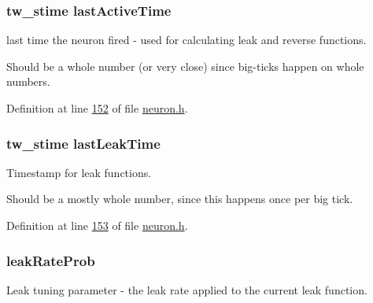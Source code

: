 \hypertarget{structneuron_state_a0658ad1f8b57a00589c6ea84f9a4ab13}{}
\subsubsection[{last\+Active\+Time}]{\setlength{\rightskip}{0pt plus 5cm}tw\+\_\+stime last\+Active\+Time}\label{structneuron_state_a0658ad1f8b57a00589c6ea84f9a4ab13}


last time the neuron fired -\/ used for calculating leak and reverse functions. 

Should be a whole number (or very close) since big-\/ticks happen on whole numbers. 

Definition at line \hyperlink{neuron_8h_source_l00152}{152} of file \hyperlink{neuron_8h_source}{neuron.\+h}.

\hypertarget{structneuron_state_a6f4e4d8fc1cf0257b486e01f628d2656}{}
\subsubsection[{last\+Leak\+Time}]{\setlength{\rightskip}{0pt plus 5cm}tw\+\_\+stime last\+Leak\+Time}\label{structneuron_state_a6f4e4d8fc1cf0257b486e01f628d2656}


Timestamp for leak functions. 

Should be a mostly whole number, since this happens once per big tick. 

Definition at line \hyperlink{neuron_8h_source_l00153}{153} of file \hyperlink{neuron_8h_source}{neuron.\+h}.

\hypertarget{structneuron_state_a9fd530a4dd6f7acd6f744ebd51d9c762}{}
\subsubsection[{leak\+Rate\+Prob}]{ leak\+Rate\+Prob}\label{structneuron_state_a9fd530a4dd6f7acd6f744ebd51d9c762}


Leak tuning parameter -\/ the leak rate applied to the current leak function. 



